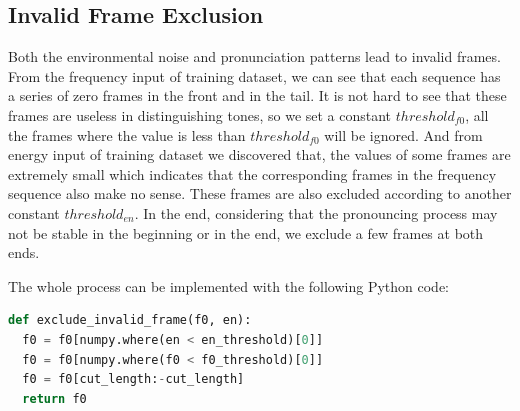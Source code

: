 \documentclass[a4paper, 11pt]{article} %
\begin{document}
\subsection{Invalid Frame Exclusion}
Both the environmental noise and pronunciation patterns lead to invalid frames. From the frequency input of training dataset, we can see that each sequence has a series of zero frames in the front and in the tail. It is not hard to see that these frames are useless in distinguishing tones, so we set a constant $threshold_{f0}$, all the frames where the value is less than $threshold_{f0}$ will be ignored. And from energy input of training dataset we discovered that, the values of some frames are extremely small which indicates that the corresponding frames in the frequency sequence also make no sense. These frames are also excluded according to another constant $threshold_{en}$. In the end, considering that the pronouncing process may not be stable in the beginning or in the end, we exclude a few frames at both ends.
\par
The whole process can be implemented with the following Python code:
\vspace{0.5cm}
\begin{mdframed}[skipabove=7pt,
	skipbelow=7pt,
	rightline=false,
	leftline=true,
	topline=false,
	bottomline=false,
	linecolor=gray,
	backgroundcolor=black!5,
	innerleftmargin=5pt,
	innerrightmargin=5pt,
	innertopmargin=-3pt,
	innerbottommargin=-5pt,
	leftmargin=0cm,
	rightmargin=0cm,
	linewidth=4pt]
\begin{lstlisting}[language=Python]
def exclude_invalid_frame(f0, en):
  f0 = f0[numpy.where(en < en_threshold)[0]]
  f0 = f0[numpy.where(f0 < f0_threshold)[0]]
  f0 = f0[cut_length:-cut_length]
  return f0
\end{lstlisting}
\end{mdframed}
\end{document}
